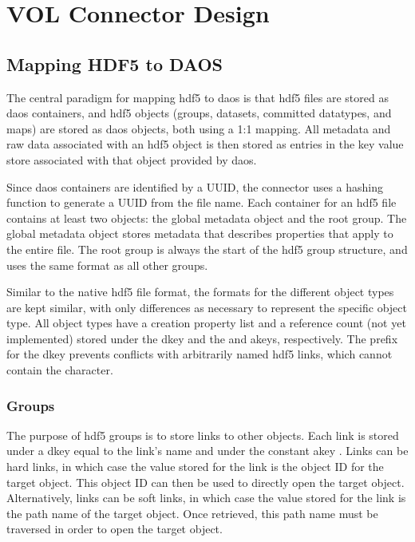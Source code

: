 \documentclass[../design_doc.tex]{subfiles}
\begin{document}
\section{VOL Connector Design}

\subsection{Mapping HDF5 to DAOS}

The central paradigm for mapping \acrshort{hdf5} to \acrshort{daos} is that \acrshort{hdf5} files are stored as \acrshort{daos} containers, and \acrshort{hdf5} objects (groups, datasets, committed datatypes, and maps) are stored as \acrshort{daos} objects, both using a 1:1 mapping. All metadata and raw data associated with an \acrshort{hdf5} object is then stored as entries in the key value store associated with that object provided by \acrshort{daos}.

Since \acrshort{daos} containers are identified by a UUID, the \gls{connector} uses a hashing function to generate a UUID from the file name. Each container for an \acrshort{hdf5} file contains at least two objects: the global metadata object and the root group. The global metadata object stores metadata that describes properties that apply to the entire file. The root group is always the start of the \acrshort{hdf5} group structure, and uses the same format as all other groups.

Similar to the native \acrshort{hdf5} file format, the formats for the different object types are kept similar, with only differences as necessary to represent the specific object type. All object types have a creation property list and a reference count (not yet implemented) stored under the  \gls{dkey} and the  and  \glspl{akey}, respectively. The \mintcinline{/} prefix for the  \gls{dkey} prevents conflicts with arbitrarily named \acrshort{hdf5} links, which cannot contain the \mintcinline{/} character.

\newpage

\subsubsection{Groups}

The purpose of \acrshort{hdf5} groups is to store links to other objects. Each link is stored under a \gls{dkey} equal to the link's name and under the constant \gls{akey} . Links can be hard links, in which case the value stored for the link is the object ID for the target object. This object ID can then be used to directly open the target object. Alternatively, links can be soft links, in which case the value stored for the link is the path name of the target object. Once retrieved, this path name must be traversed in order to open the target object.
\end{document}
